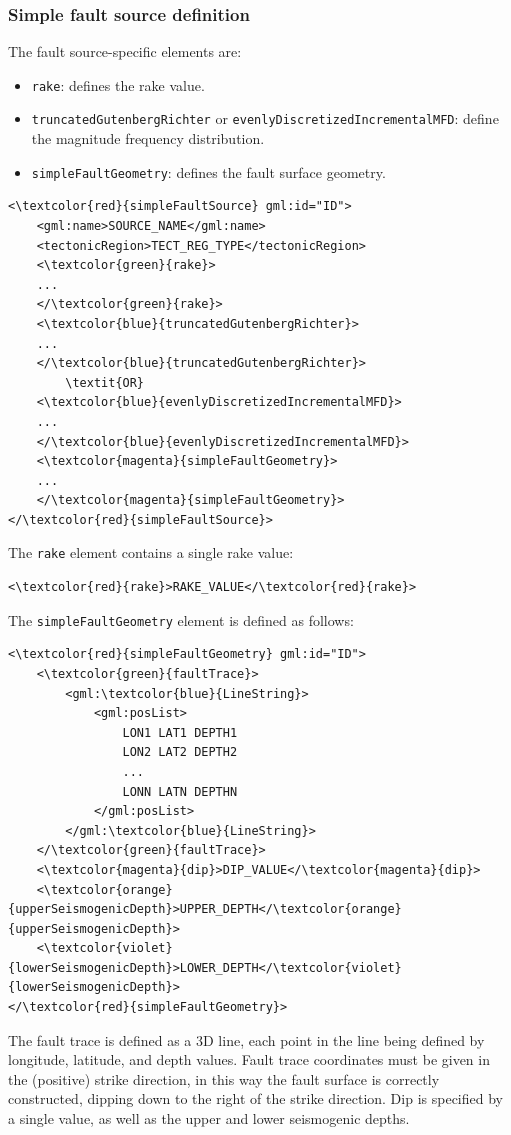 \subsubsection{Simple fault source definition} \label{simpleFaultSource}
The fault source-specific elements are:
\begin{itemize}
\item \Verb+rake+: defines the rake value.
\item \Verb+truncatedGutenbergRichter+ or \Verb+evenlyDiscretizedIncrementalMFD+: define the magnitude frequency distribution.
\item \Verb+simpleFaultGeometry+: defines the fault surface geometry.
\end{itemize}
\begin{Verbatim}[frame=single, commandchars=\\\{\},fontsize=\normalsize, samepage=true]
<\textcolor{red}{simpleFaultSource} gml:id="ID">
	<gml:name>SOURCE_NAME</gml:name>
	<tectonicRegion>TECT_REG_TYPE</tectonicRegion>
	<\textcolor{green}{rake}>
	...
	</\textcolor{green}{rake}>
	<\textcolor{blue}{truncatedGutenbergRichter}>
	...
	</\textcolor{blue}{truncatedGutenbergRichter}>
		\textit{OR}
	<\textcolor{blue}{evenlyDiscretizedIncrementalMFD}>
	...
	</\textcolor{blue}{evenlyDiscretizedIncrementalMFD}>
	<\textcolor{magenta}{simpleFaultGeometry}>
	...
	</\textcolor{magenta}{simpleFaultGeometry}>
</\textcolor{red}{simpleFaultSource}>
\end{Verbatim}
The \Verb+rake+ element contains a single rake value:
\begin{Verbatim}[frame=single, commandchars=\\\{\},fontsize=\normalsize, samepage=true]
<\textcolor{red}{rake}>RAKE_VALUE</\textcolor{red}{rake}>
\end{Verbatim}
The \Verb+simpleFaultGeometry+ element is defined as follows:
\begin{Verbatim}[frame=single, commandchars=\\\{\},fontsize=\normalsize, samepage=true]
<\textcolor{red}{simpleFaultGeometry} gml:id="ID">
	<\textcolor{green}{faultTrace}>
		<gml:\textcolor{blue}{LineString}>
			<gml:posList>
				LON1 LAT1 DEPTH1
				LON2 LAT2 DEPTH2
				...
				LONN LATN DEPTHN
			</gml:posList>
		</gml:\textcolor{blue}{LineString}>
	</\textcolor{green}{faultTrace}>
	<\textcolor{magenta}{dip}>DIP_VALUE</\textcolor{magenta}{dip}>
	<\textcolor{orange}{upperSeismogenicDepth}>UPPER_DEPTH</\textcolor{orange}{upperSeismogenicDepth}>
	<\textcolor{violet}{lowerSeismogenicDepth}>LOWER_DEPTH</\textcolor{violet}{lowerSeismogenicDepth}>
</\textcolor{red}{simpleFaultGeometry}>
\end{Verbatim}
The fault trace is defined as a 3D line, each point in the line being defined by longitude, latitude, and depth values. Fault trace coordinates must be given in the (positive) strike direction, in this way the fault surface is correctly constructed, dipping down to the right of the strike direction. Dip is specified by a single value, as well as the upper and lower seismogenic depths. 

